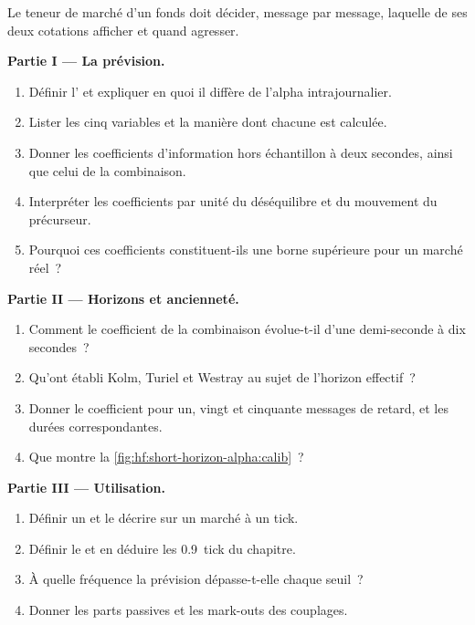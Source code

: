 \begin{problem}\label{pb:hf:short-horizon-alpha:1}
Le teneur de marché d'un fonds doit décider, message par message, laquelle de ses deux cotations afficher et quand agresser.

\medskip\noindent\textbf{Partie I --- La prévision.}
\begin{enumerate}
\item Définir l' et expliquer en quoi il diffère de l'alpha intrajournalier.
\item Lister les cinq variables et la manière dont chacune est calculée.
\item Donner les coefficients d'information hors échantillon à deux secondes, ainsi que celui de la combinaison.
\item Interpréter les coefficients par unité du déséquilibre et du mouvement du précurseur.
\item Pourquoi ces coefficients constituent-ils une borne supérieure pour un marché réel~?
\end{enumerate}

\medskip\noindent\textbf{Partie II --- Horizons et ancienneté.}
\begin{enumerate}[resume]
\item Comment le coefficient de la combinaison évolue-t-il d'une demi-seconde à dix secondes~?
\item Qu'ont établi Kolm, Turiel et Westray au sujet de l'horizon effectif~?
\item Donner le coefficient pour un, vingt et cinquante messages de retard, et les durées correspondantes.
\item Que montre la \cref{fig:hf:short-horizon-alpha:calib}~?
\end{enumerate}

\medskip\noindent\textbf{Partie III --- Utilisation.}
\begin{enumerate}[resume]
\item Définir un  et le décrire sur un marché à un tick.
\item Définir le  et en déduire les 0.9~tick du chapitre.
\item À quelle fréquence la prévision dépasse-t-elle chaque seuil~?
\item Donner les parts passives et les mark-outs des couplages.
\end{enumerate}


\end{problem}
